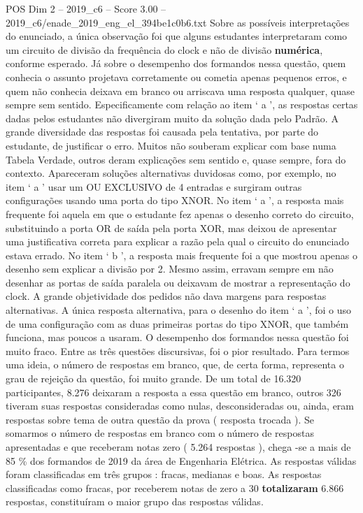 \begin{textsample}{POS Dim 2 – 2019\_c6 – Score 3.00 – 2019\_c6/enade\_2019\_eng\_el\_394be1c0b6.txt}
Sobre as possíveis interpretações do enunciado, a única observação foi que alguns estudantes interpretaram como um circuito de divisão da frequência do clock e não de divisão \textbf{numérica}, conforme esperado.
Já sobre o desempenho dos formandos nessa questão, quem conhecia o assunto projetava corretamente ou cometia apenas pequenos erros, e quem não conhecia deixava em branco ou arriscava uma resposta qualquer, quase sempre sem sentido.
Especificamente com relação ao item ‘ a ’, as respostas certas dadas pelos estudantes não divergiram muito da solução dada pelo Padrão.
A grande diversidade das respostas foi causada pela tentativa, por parte do estudante, de justificar o erro.
Muitos não souberam explicar com base numa Tabela Verdade, outros deram explicações sem sentido e, quase sempre, fora do contexto.
Apareceram soluções alternativas duvidosas como, por exemplo, no item ‘ a ’ usar um OU EXCLUSIVO de 4 entradas e surgiram outras configurações usando uma porta do tipo XNOR.
No item ‘ a ’, a resposta mais frequente foi aquela em que o estudante fez apenas o desenho correto do circuito, substituindo a porta OR de saída pela porta XOR, mas deixou de apresentar uma justificativa correta para explicar a razão pela qual o circuito do enunciado estava errado.
No item ‘ b ’, a resposta mais frequente foi a que mostrou apenas o desenho sem explicar a divisão por 2.
Mesmo assim, erravam sempre em não desenhar as portas de saída paralela ou deixavam de mostrar a representação do clock.
A grande objetividade dos pedidos não dava margens para respostas alternativas.
A única resposta alternativa, para o desenho do item ‘ a ’, foi o uso de uma configuração com as duas primeiras portas do tipo XNOR, que também funciona, mas poucos a usaram.
O desempenho dos formandos nessa questão foi muito fraco.
Entre as três questões discursivas, foi o pior resultado.
Para termos uma ideia, o número de respostas em branco, que, de certa forma, representa o grau de rejeição da questão, foi muito grande.
De um total de 16.320 participantes, 8.276 deixaram a resposta a essa questão em branco, outros 326 tiveram suas respostas consideradas como nulas, desconsideradas ou, ainda, eram respostas sobre tema de outra questão da prova ( resposta trocada ).
Se somarmos o número de respostas em branco com o número de respostas apresentadas e que receberam notas zero ( 5.264 respostas ), chega -se a mais de 85 \% dos formandos de 2019 da área de Engenharia Elétrica.
As respostas válidas foram classificadas em três grupos : fracas, medianas e boas.
As respostas classificadas como fracas, por receberem notas de zero a 30 \textbf{totalizaram} 6.866 respostas, constituíram o maior grupo das respostas válidas.

\end{textsample}
